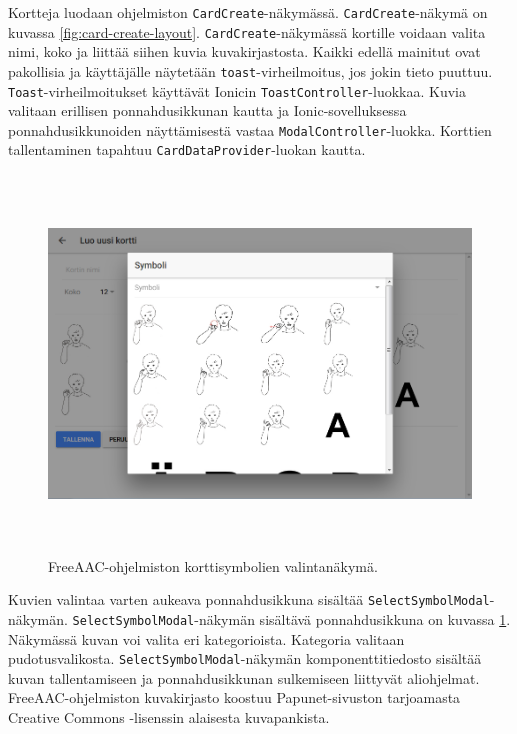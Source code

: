 \documentclass[utf8]{gradu3}
\begin{document}
Kortteja luodaan ohjelmiston \texttt{CardCreate}-näkymässä. \texttt{CardCreate}-näkymä on kuvassa \ref{fig:card-create-layout}. \texttt{CardCreate}-näkymässä kortille voidaan valita nimi, koko ja liittää siihen kuvia kuvakirjastosta. Kaikki edellä mainitut ovat pakollisia ja käyttäjälle näytetään \texttt{toast}-virheilmoitus, jos jokin tieto puuttuu. \texttt{Toast}-virheilmoitukset käyttävät Ionicin \texttt{ToastController}-luokkaa. Kuvia valitaan erillisen ponnahdusikkunan kautta ja Ionic-sovelluksessa ponnahdusikkunoiden näyttämisestä vastaa \texttt{ModalController}-luokka. Korttien tallentaminen tapahtuu \texttt{CardDataProvider}-luokan kautta.

\begin{figure}[h]\centering
  \includegraphics[height=10cm,keepaspectratio]{select-symbol-modal-layout}
  \caption[FreeAAC-ohjelmiston korttisymbolien valintanäkymä.]
  {FreeAAC-ohjelmiston korttisymbolien valintanäkymä.}
  \label{fig:select-symbol-modal-layout}
\end{figure}

Kuvien valintaa varten aukeava ponnahdusikkuna sisältää \texttt{SelectSymbolModal}-näkymän. \texttt{SelectSymbolModal}-näkymän sisältävä ponnahdusikkuna on kuvassa \ref{fig:select-symbol-modal-layout}. Näkymässä kuvan voi valita eri kategorioista. Kategoria valitaan pudotusvalikosta. \texttt{SelectSymbolModal}-näkymän komponenttitiedosto sisältää kuvan tallentamiseen ja ponnahdusikkunan sulkemiseen liittyvät aliohjelmat. FreeAAC-ohjelmiston kuvakirjasto koostuu Papunet-sivuston tarjoamasta Creative Commons -lisenssin alaisesta kuvapankista.
\end{document}
